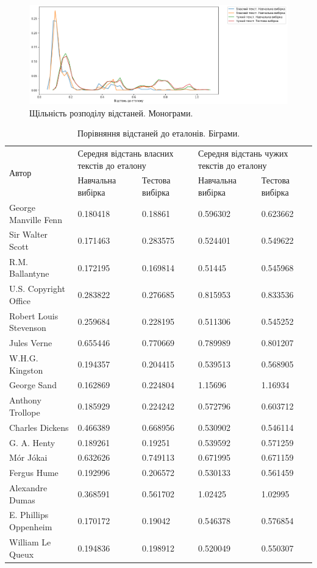 \documentclass[12pt, a4paper]{extarticle}
\begin{document}
\begin{figure}
\includegraphics[width=\linewidth]{figures/2.png}
\centering
\caption{Щільність розподілу відстаней. Монограми.}
\label{fig:2}
\end{figure}

\begin{center}
\begin{table}
\begin{tabular}{|p{11em}|p{5em}|p{5em}|p{5em}|p{5em}|}
\hline
\multirow{2}{4em}{Автор} & \multicolumn{2}{|p{10em}|}{Середня відстань власних текстів до еталону} & \multicolumn{2}{|p{10em}|}{Середня відстань чужих текстів до еталону} \\
\cline{2-5}
& Навчальна вибірка & Тестова вибірка & Навчальна вибірка & Тестова вибірка\\
\hline
George Manville Fenn & 0.180418 & 0.18861 & 0.596302 & 0.623662\\
Sir Walter Scott & 0.171463 & 0.283575 & 0.524401 & 0.549622\\
R.M. Ballantyne & 0.172195 & 0.169814 & 0.51445 & 0.545968\\
U.S. Copyright Office & 0.283822 & 0.276685 & 0.815953 & 0.833536\\
Robert Louis Stevenson & 0.259684 & 0.228195 & 0.511306 & 0.545252\\
Jules Verne & 0.655446 & 0.770669 & 0.789989 & 0.801207\\
W.H.G. Kingston & 0.194357 & 0.204415 & 0.539513 & 0.568905\\
George Sand & 0.162869 & 0.224804 & 1.15696 & 1.16934\\
Anthony Trollope & 0.185929 & 0.224242 & 0.572796 & 0.603712\\
Charles Dickens & 0.466389 & 0.668956 & 0.530902 & 0.546114\\
G. A. Henty & 0.189261 & 0.19251 & 0.539592 & 0.571259\\
Mór Jókai & 0.632626 & 0.749113 & 0.671995 & 0.671159\\
Fergus Hume & 0.192996 & 0.206572 & 0.530133 & 0.561459\\
Alexandre Dumas & 0.368591 & 0.561702 & 1.02425 & 1.02995\\
E. Phillips Oppenheim & 0.170172 & 0.19042 & 0.546378 & 0.576854\\
William Le Queux & 0.194836 & 0.198912 & 0.520049 & 0.550307\\
\hline
\end{tabular}
\caption{Порівняння відстаней до еталонів. Біграми.}
\label{tab:3}
\end{table}
\end{center}
\end{document}
